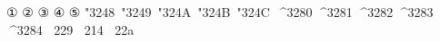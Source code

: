 \documentclass{article}
\begin{document}
① ② ③ ④ ⑤
    
\char"3248\    \char"3249\    \char"324A\    \char"324B\    \char"324C\
^^^^3280       ^^^^3281       ^^^^3282       ^^^^3283       ^^^^3284
^^^^^1f229     ^^^^^1f214     ^^^^^1f22a
\end{document}
